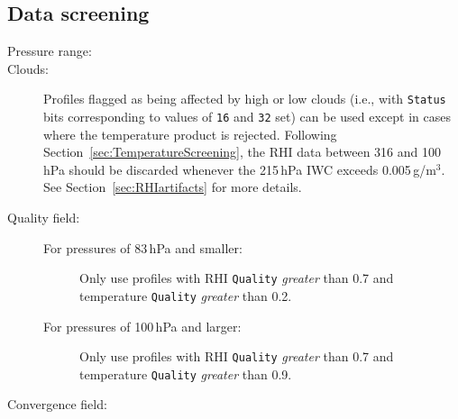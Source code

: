\begin{nofloatpages}
\subsection{Data screening}
\label{sec:RHIScreening}
\begin{description}

  \item[Pressure range:]  \standardrangestatement 
  
  \standardprecisionrule
  
  \evenstatusrule

  \item[Clouds:] Profiles flagged as being affected by high or low clouds (i.e., with \texttt{Status} bits corresponding to values of \texttt{16} and \texttt{32} set) can be used except in cases where the temperature product is rejected. Following Section~\ref{sec:TemperatureScreening}, the RHI data between 316 and 100\,hPa should be discarded whenever the 215\,hPa IWC exceeds 0.005\,g/m$^{3}$. See Section~\ref{sec:RHIartifacts} for more details.

  \item[Quality field:] 
    \begin{description}
      \item[For pressures of 83\,hPa and smaller:] Only use profiles with RHI \texttt{Quality} \emph{greater} than 0.7 and temperature \texttt{Quality} \emph{greater} than 0.2.
      \item[For pressures of 100\,hPa and larger:] Only use profiles with RHI \texttt{Quality} \emph{greater} than 0.7 and temperature \texttt{Quality} \emph{greater} than 0.9.
    \end{description}

  \item[Convergence field:] 


\end{description}
\end{nofloatpages}
